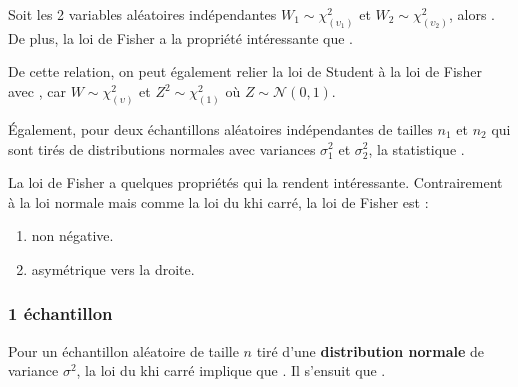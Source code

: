 \documentclass[french]{article}
\begin{document}
\begin{multicols*}{2}
\begin{rappel_enhanced}
Soit les 2 variables aléatoires indépendantes $W_{1} \sim \chi^{2}_{(\upsilon_{1})}$ et $W_{2} \sim \chi^{2}_{(\upsilon_{2})}$, alors . De plus, la loi de Fisher a la propriété intéressante que .

\bigskip

De cette relation, on peut également relier la loi de Student à la loi de Fisher avec , car $W \sim \chi^{2}_{(\upsilon)}$ et $Z^{2} \sim \chi^{2}_{(1)}$ où $Z \sim \mathcal{N}(0, 1)$.

\bigskip

Également, pour deux échantillons aléatoires indépendantes de tailles $n_{1}$ et $n_{2}$ qui sont tirés de distributions normales avec variances $\sigma_{1}^{2}$ et $\sigma_{2}^{2}$, la statistique .

\bigskip

La loi de Fisher a quelques propriétés qui la rendent intéressante. Contrairement à la loi normale mais comme la loi du khi carré, la loi de Fisher est :
\begin{enumerate}[label = \rectangled{\arabic*}{lightgray}]
	\item	non négative.
	\item	asymétrique vers la droite.
\end{enumerate}
\end{rappel_enhanced}



\columnbreak
\subsubsection{1 échantillon}
Pour un échantillon aléatoire de taille $n$ tiré d'une \textbf{distribution normale} de variance $\sigma^{2}$, la loi du khi carré implique que . Il s'ensuit que .

\bigskip


\end{multicols*}
\end{document}
